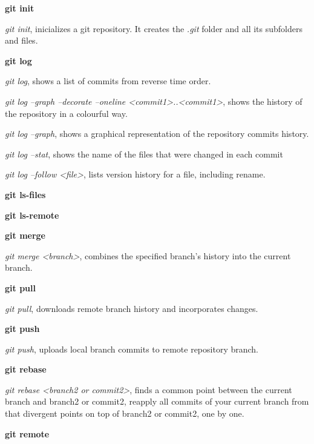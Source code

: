 \begin{refsection}
\vspace*{5mm} \noindent \textbf{git init}

\noindent\emph{git init}, inicializes a git repository. It creates the \emph{.git} folder and all its subfolders and files.

\vspace*{5mm} \noindent \textbf{git log}

\noindent\emph{git log}, shows a list of commits from reverse time order.

\noindent\emph{git log --graph --decorate --oneline <commit1>..<commit1>}, shows the history of the repository in a colourful way.

\noindent\emph{git log --graph}, shows a graphical representation of the repository commits history.

\noindent\emph{git log --stat}, shows the name of the files that were changed in each commit

\noindent\emph{git log --follow <file>}, lists version history for a file, including rename.

\vspace*{5mm} \noindent \textbf{git ls-files}

\vspace*{5mm} \noindent \textbf{git ls-remote}

\vspace*{5mm} \noindent \textbf{git merge}

\noindent\emph{git merge <branch>}, combines the specified branch’s history into the current branch.

\vspace*{5mm} \noindent \textbf{git pull}

\noindent\emph{git pull}, downloads remote branch history and incorporates changes.

\vspace*{5mm} \noindent \textbf{git push}

\noindent\emph{git push}, uploads local branch commits to remote repository branch.

\vspace*{5mm} \noindent \textbf{git rebase}

\noindent\emph{git rebase <branch2 or commit2>}, finds a common point between the current branch and branch2 or commit2, reapply all commits of your current branch from that divergent points on top of branch2 or commit2, one by one.

\vspace*{5mm} \noindent \textbf{git remote}


\end{refsection}
